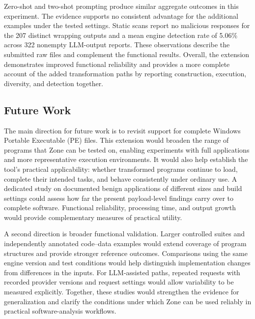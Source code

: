 Zero-shot and two-shot prompting produce similar aggregate outcomes in
this experiment. The evidence supports no consistent advantage for the
additional examples under the tested settings. Static scans report no
malicious responses for the 207 distinct wrapping outputs and a mean
engine detection rate of 5.06\% across 322 nonempty LLM-output reports.
These observations describe the submitted raw files and complement the
functional results. Overall, the extension demonstrates improved
functional reliability and provides a more complete account of the
added transformation paths by reporting construction, execution,
diversity, and detection together.

\subsection{Future Work}\label{sec:future_work}
The main direction for future work is to revisit support for complete
Windows Portable Executable (PE) files. This extension would broaden
the range of programs that Zone can be tested on, enabling experiments
with full applications and more representative execution environments.
It would also help establish the tool's practical applicability: whether
transformed programs continue to load, complete their intended tasks,
and behave consistently under ordinary use. A dedicated study on
documented benign applications of different sizes and build settings
could assess how far the present payload-level findings carry over to
complete software. Functional reliability, processing time, and output
growth would provide complementary measures of practical utility.

A second direction is broader functional validation. Larger controlled
suites and independently annotated code--data examples would extend
coverage of program structures and provide stronger reference outcomes.
Comparisons using the same engine version and test conditions would
help distinguish implementation changes from differences in the inputs.
For LLM-assisted paths, repeated requests with recorded provider versions
and request settings would allow variability to be measured explicitly.
Together, these studies would strengthen the evidence for generalization
and clarify the conditions under which Zone can be used reliably in
practical software-analysis workflows.
